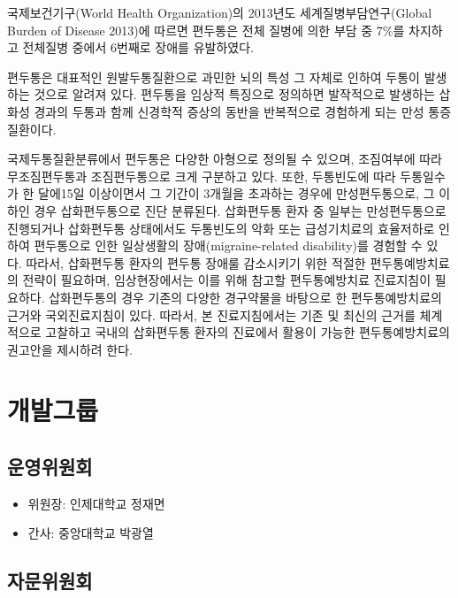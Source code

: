 \documentclass[]{book}
\providecommand{\tightlist}{%
  \setlength{\itemsep}{0pt}\setlength{\parskip}{0pt}}
\begin{document}
국제보건기구(World Health Organization)의 2013년도 세계질병부담연구(Global Burden of Disease 2013)에 따르면 편두통은 전체 질병에 의한 부담 중 7\%를 차지하고 전체질병 중에서 6번째로 장애를 유발하였다.

편두통은 대표적인 원발두통질환으로 과민한 뇌의 특성 그 자체로 인하여 두통이 발생하는 것으로 알려져 있다. 편두통을 임상적 특징으로 정의하면 발작적으로 발생하는 삽화성 경과의 두통과 함께 신경학적 증상의 동반을 반복적으로 경험하게 되는 만성 통증질환이다.

국제두통질환분류에서 편두통은 다양한 아형으로 정의될 수 있으며, 조짐여부에 따라 무조짐편두통과 조짐편두통으로 크게 구분하고 있다. 또한, 두통빈도에 따라 두통일수가 한 달에15일 이상이면서 그 기간이 3개월을 초과하는 경우에 만성편두통으로, 그 이하인 경우 삽화편두통으로 진단 분류된다. 삽화편두통 환자 중 일부는 만성편두통으로 진행되거나 삽화편두통 상태에서도 두통빈도의 악화 또는 급성기치료의 효율저하로 인하여 편두통으로 인한 일상생활의 장애(migraine-related disability)를 경험할 수 있다. 따라서, 삽화편두통 환자의 편두통 장애룰 감소시키기 위한 적절한 편두통예방치료의 전략이 필요하며, 임상현장에서는 이를 위해 참고할 편두통예방치료 진료지침이 필요하다. 삽화편두통의 경우 기존의 다양한 경구약물을 바탕으로 한 편두통예방치료의 근거와 국외진료지침이 있다. 따라서, 본 진료지침에서는 기존 및 최신의 근거를 체계적으로 고찰하고 국내의 삽화편두통 환자의 진료에서 활용이 가능한 편두통예방치료의 권고안을 제시하려 한다.

\cleardoublepage

\hypertarget{appendix-appendix}{%
\appendix}


\hypertarget{section-5}{%
\chapter{개발그룹}\label{section-5}}

\hypertarget{section-6}{%
\section{운영위원회}\label{section-6}}

\begin{itemize}
\tightlist
\item
  위원장: 인제대학교 정재면
\item
  간사: 중앙대학교 박광열
\end{itemize}

\hypertarget{section-7}{%
\section{자문위원회}\label{section-7}}
\end{document}
